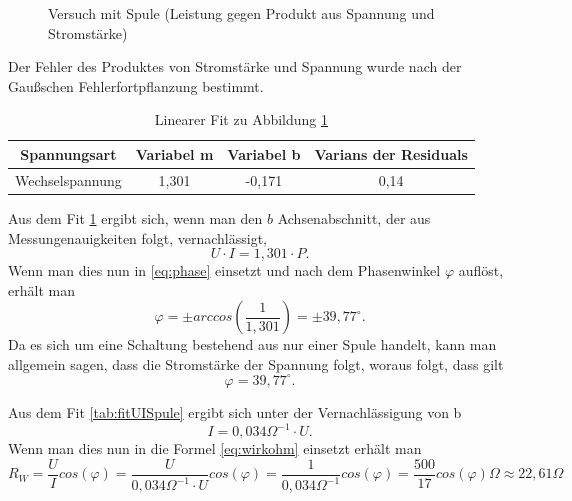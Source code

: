 \begin{figure}[H]
  \centering
  \caption{Versuch mit Spule (Leistung gegen Produkt aus Spannung und Stromstärke)}
  \label{fig:PUISpule}
\end{figure}
Der Fehler des Produktes von Stromstärke und Spannung wurde nach der Gaußschen Fehlerfortpflanzung bestimmt.
\begin{table}[H]
  \centering
  \begin{tabular}{c | c | c | c}
    Spannungsart & Variabel m & Variabel b & Varians der Residuals\\ \hline
    Wechselspannung & 1,301 & -0,171 & 0,14
  \end{tabular}
  \caption{Linearer Fit zu Abbildung \ref{fig:PUISpule}}
  \label{tab:fitPUISpule}
\end{table}
Aus dem Fit \ref{tab:fitPUISpule} ergibt sich, wenn man den $b$ Achsenabschnitt, der aus Messungenauigkeiten folgt, vernachlässigt,
\begin{equation}
U\cdot I=1,301\cdot P.
\end{equation}
Wenn man dies nun in \ref{eq:phase} einsetzt und nach dem Phasenwinkel $\varphi$ auflöst, erhält man
\begin{equation}
\varphi = \pm arccos(\frac{1}{1,301}) = \pm 39,77^\circ.
\end{equation}
Da es sich um eine Schaltung bestehend aus nur einer Spule handelt, kann man allgemein sagen, dass die Stromstärke der Spannung folgt, woraus folgt, dass gilt
\begin{equation}
\varphi = 39,77^\circ.
\end{equation}

Aus dem Fit \ref{tab:fitUISpule} ergibt sich unter der Vernachlässigung von b
\begin{equation}
I=0,034\Omega^{-1}\cdot U.
\end{equation}
Wenn man dies nun in die Formel \ref{eq:wirkohm} einsetzt erhält man
\begin{equation}
R_W=\frac{U}{I}cos(\varphi)=\frac{U}{0,034\Omega^{-1}\cdot U}cos(\varphi)=\frac{1}{0,034\Omega^{-1}}cos(\varphi)= \frac{500}{17}cos(\varphi)\Omega \approx 22,61 \Omega
\end{equation}
